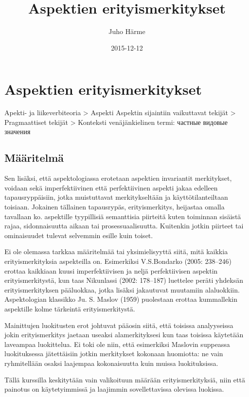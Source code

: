 \documentclass[finnish,russian,]{article}
\title{Aspektien erityismerkitykset}
\author{Juho Härme}
\date{2015-12-12}
\begin{document}
\maketitle

\section{Aspektien
erityismerkitykset}\label{aspektien-erityismerkitykset}

Apekti- ja liikeverbiteoria \textgreater{} Aspekti Aspektin sijaintiin
vaikuttavat tekijät \textgreater{} Pragmaattiset tekijät \textgreater{}
Konteksti venäjänkielinen termi: частные видовые значения

\subsection{Määritelmä}\label{muxe4uxe4ritelmuxe4}

Sen lisäksi, että aspektologiassa erotetaan aspektien invariantit
merkitykset, voidaan sekä imperfektiivinen että perfektiivinen aspekti
jakaa edelleen tapausryppäisiin, jotka muistuttavat merkitykseltään ja
käyttötilanteiltaan toisiaan. Jokainen tällainen tapausrypäs,
erityismerkitys, heijastaa omalla tavallaan ko. aspektille tyypillisiä
semanttisia piirteitä kuten toiminnan sisäistä rajaa, sidonnaisuutta
aikaan tai prosessuaalisuutta. Kuitenkin jotkin piirteet tai
ominaisuudet tulevat selvemmin esille kuin toiset.

Ei ole olemassa tarkkaa määritelmää tai yksimielisyyttä siitä, mitä
kaikkia erityismerkityksia aspekteilla on. Esimerkiksi V.S.Bondarko
(2005: 238--246) erottaa kaikkiaan kuusi imperfektiivisen ja neljä
perfektiivisen aspektin erityismerkitystä, kun taas Nikunlassi (2002:
178--187) luettelee peräti yhdeksän erityismerkityksen pääluokkaa, jotka
lisäksi jakautuvat muutamiin alaluokkiin. Aspektologian klassikko Ju. S.
Maslov (1959) puolestaan erottaa kummallekin aspektille kolme tärkeintä
erityismerkitystä.

Mainittujen luokitusten erot johtuvat pääosin siitä, että toisissa
analyyseissa jokin erityismerkitys jaetaan useaksi alamerkityksesi kun
taas toisissa käytetään laveampaa luokittelua. Ei toki ole niin, että
esimerkiksi Maslovin suppeassa luokituksessa jätettäisiin jotkin
merkitykset kokonaan huomiotta: ne vain ryhmitellään osaksi laajempaa
kokonaisuutta kuin muissa luokituksissa.

Tällä kurssilla keskitytään vain valikoituun määrään erityismerkityksiä,
niin että painotus on käytetyimmissä ja laajimmin sovellettavissa
olevissa luokissa.
\end{document}
